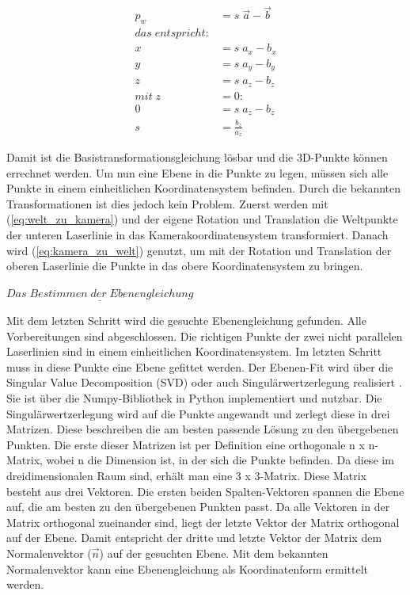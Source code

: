 		\begin{equation}
			\begin{aligned}
				p_w &= s \; \vec{a} - \vec{b} \\
				das \; entspricht: \\
				x &= s \; a_x - b_x \\
				y &= s \; a_y - b_y \\
				z &= s \; a_z - b_z \\
				mit \; z &= 0: \\
				0 &= s \; a_z - b_z \\
				s &= \frac{b_z}{a_z}
			\end{aligned}
		\end{equation}
		
		Damit ist die Basistransformationsgleichung lösbar und die 3D-Punkte können errechnet werden. Um nun eine Ebene in die Punkte zu legen, müssen sich alle Punkte in einem einheitlichen Koordinatensystem befinden. Durch die bekannten Transformationen ist dies jedoch kein Problem. Zuerst werden mit (\ref{eq:welt_zu_kamera}) und der eigene Rotation und Translation die Weltpunkte der unteren Laserlinie in das Kamerakoordinatensystem transformiert. Danach wird (\ref{eq:kamera_zu_welt}) genutzt, um mit der Rotation und Translation der oberen Laserlinie die Punkte in das obere Koordinatensystem zu bringen.
	
		$\underline{Das \; Bestimmen \; der \; Ebenengleichung}$
		
		Mit dem letzten Schritt wird die gesuchte Ebenengleichung gefunden. Alle Vorbereitungen sind abgeschlossen. Die richtigen Punkte der zwei nicht parallelen Laserlinien sind in einem einheitlichen Koordinatensystem. Im letzten Schritt muss in diese Punkte eine Ebene gefittet werden. Der Ebenen-Fit wird über die Singular Value Decomposition (SVD) oder auch Singulärwertzerlegung realisiert \citep[Vgl.][S. 349 ff]{liesen_lineare_2021}. Sie ist über die Numpy-Bibliothek in Python implementiert und nutzbar. Die Singulärwertzerlegung wird auf die Punkte angewandt und zerlegt diese in drei Matrizen. Diese beschreiben die am besten passende Lösung zu den übergebenen Punkten. Die erste dieser Matrizen ist per Definition eine orthogonale n x n-Matrix, wobei n die Dimension ist, in der sich die Punkte befinden. Da diese im dreidimensionalen Raum sind, erhält man eine 3 x 3-Matrix. Diese Matrix besteht aus drei Vektoren. Die ersten beiden Spalten-Vektoren spannen die Ebene auf, die am besten zu den übergebenen Punkten passt. Da alle Vektoren in der Matrix orthogonal zueinander sind, liegt der letzte Vektor der Matrix orthogonal auf der Ebene. Damit entspricht der dritte und letzte Vektor der Matrix dem Normalenvektor ($ \vec{n} $) auf der gesuchten Ebene. Mit dem bekannten Normalenvektor kann eine Ebenengleichung als Koordinatenform ermittelt werden. 
		
